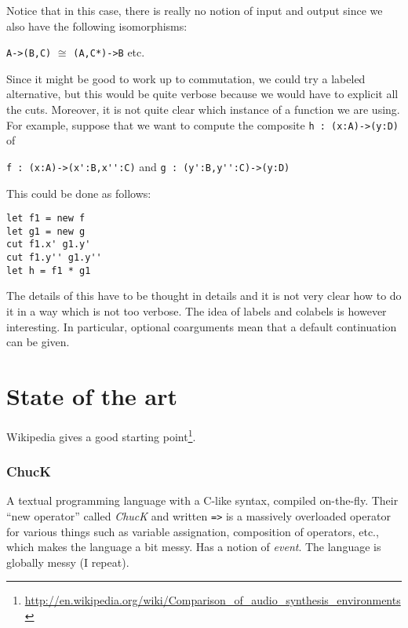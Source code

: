\documentclass[a4paper,titlepage]{article}
\begin{document}
Notice that in this case, there is really no notion of input and output since we
also have the following isomorphisms:
\begin{center}
  \verb|A->(B,C)|
  \qquad$\cong$\qquad
  \verb|(A,C*)->B|
  \qquad
  etc.
\end{center}

Since it might be good to work up to commutation, we could try a labeled
alternative, but this would be quite verbose because we would have to explicit
all the cuts. Moreover, it is not quite clear which instance of a function we
are using. For example, suppose that we want to compute the composite
\verb|h : (x:A)->(y:D)| of
\begin{center}
  \verb|f : (x:A)->(x':B,x'':C)|
  \qquad and\qquad
  \verb|g : (y':B,y'':C)->(y:D)|
\end{center}
This could be done as follows:
\begin{verbatim}
let f1 = new f
let g1 = new g
cut f1.x' g1.y'
cut f1.y'' g1.y''
let h = f1 * g1
\end{verbatim}
The details of this have to be thought in details and it is not very clear how
to do it in a way which is not too verbose. The idea of labels and colabels is
however interesting. In particular, optional coarguments mean that a default
continuation can be given.

\section{State of the art}
Wikipedia gives a good starting
point\footnote{\url{http://en.wikipedia.org/wiki/Comparison_of_audio_synthesis_environments}}.


\subsubsection{ChucK}
A textual programming language with a C-like syntax, compiled
on-the-fly\cite{chuck}. Their ``new operator'' called \emph{ChucK} and written
\texttt{=>} is a massively overloaded operator for various things such as
variable assignation, composition of operators, etc., which makes the language a
bit messy. Has a notion of \emph{event}. The language is globally messy (I
repeat).
\end{document}
